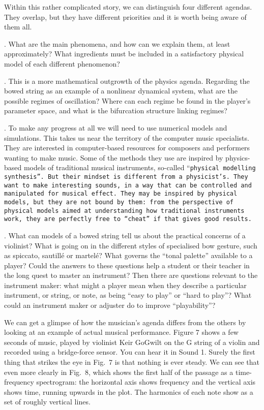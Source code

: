   Within this rather complicated story, we can distinguish four different 
  agendas. They overlap, but they have different priorities and it is worth 
  being aware of them all. 

  . What are the main phenomena, and how can we 
  explain them, at least approximately? What ingredients must be included in a 
  satisfactory physical model of each different phenomenon? 

  . This is a more mathematical 
  outgrowth of the physics agenda. Regarding the bowed string as an example of 
  a nonlinear dynamical system, what are the possible regimes of oscillation? 
  Where can each regime be found in the player’s parameter space, and what is 
  the bifurcation structure linking regimes? 

  . To make any progress at all we will 
  need to use numerical models and simulations. This takes us near the 
  territory of the computer music specialists. They are interested in 
  computer-based resources for composers and performers wanting to make music. 
  Some of the methods they use are inspired by physics-based models of 
  traditional musical instruments, so-called “\tt{}physical modelling synthesis\rm{}”. 
  But their mindset is different from a physicist’s. They want to make 
  interesting sounds, in a way that can be controlled and manipulated for 
  musical effect. They may be inspired by physical models, but they are not 
  bound by them: from the perspective of physical models aimed at understanding 
  how traditional instruments work, they are perfectly free to “cheat” if that 
  gives good results. 

  . What can models of a bowed string tell us 
  about the practical concerns of a violinist? What is going on in the 
  different styles of specialised bow gesture, such as spiccato, sautillé or 
  martelé? What governs the “tonal palette” available to a player? Could the 
  answers to these questions help a student or their teacher in the long quest 
  to master an instrument? Then there are questions relevant to the instrument 
  maker: what might a player mean when they describe a particular instrument, 
  or string, or note, as being “easy to play” or “hard to play”? What could an 
  instrument maker or adjuster do to improve “playability”? 

  We can get a glimpse of how the musician’s agenda differs from the others by 
  looking at an example of actual musical performance. Figure 7 shows a few 
  seconds of music, played by violinist Keir GoGwilt on the G string of a 
  violin and recorded using a bridge-force sensor. You can hear it in Sound 1. 
  Surely the first thing that strikes the eye in Fig.\ 7 is that nothing is 
  ever steady. We can see that even more clearly in Fig.\ 8, which shows the 
  first half of the passage as a time-frequency spectrogram: the horizontal 
  axis shows frequency and the vertical axis shows time, running upwards in the 
  plot. The harmonics of each note show as a set of roughly vertical lines. 

